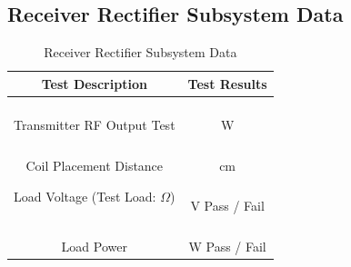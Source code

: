 \documentclass[12pt]{article}
\begin{document}
\begin{appendices}
\subsection{Receiver Rectifier Subsystem Data}

\begin{table}[h!]
\centering
\caption*{Receiver Rectifier Subsystem Data}
\begin{tabular}{ | c | c | }
\hline
\textbf{Test Description} & \textbf{Test Results} \\
\hline
\parbox{0.5\linewidth}{\raggedright \hfill \\[-0.25 em]
Transmitter RF Output Test
\hfill \\[0.1 em]} &  \parbox{0.4\linewidth}{\centering \hfill \\ [0.7 em]\underline{\hspace{0.625in}} 
 W
\hfill \\ [0.3 em]} \\ 
\hline
\parbox{0.5\linewidth}{\raggedright \hfill \\[-0.25 em]
Coil Placement Distance
\hfill \\[0.1 em]} &  \parbox{0.4\linewidth}{\centering \hfill \\ [0.7 em]\underline{\hspace{0.625in}} 
 cm
\hfill \\ [0.3 em]} \\ 
\hline
\parbox{0.5\linewidth}{\raggedright \hfill \\[-0.25 em]
Load Voltage (Test Load: \underline{\hspace{0.225in}} $\Omega$)
\hfill \\[0.1 em]} &  \parbox{0.4\linewidth}{\raggedright \hfill \\ [0.7 em]\underline{\hspace{0.625in}} 
 V 
\hspace{0.125 in}Pass \space / \space  Fail \hfill \\ [0.3 em]} \\ 
\hline
\parbox{0.5\linewidth}{\raggedright \hfill \\[-0.25 em]
Load Power
\hfill \\[0.1 em]} &  \parbox{0.4\linewidth}{\raggedright \hfill \\ [0.7 em]\underline{\hspace{0.625in}} 
 W
\hspace{0.125 in}Pass \space / \space  Fail \hfill \\ [0.3 em]} \\ 

\end{tabular}
\end{table}
\end{appendices}
\end{document}
